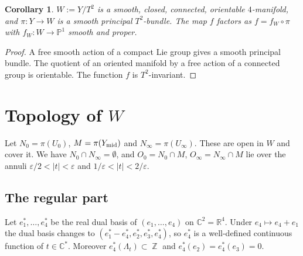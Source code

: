 \documentclass{article}
\DeclareMathOperator{\Z}{\mathbb{Z}}
\newtheorem{corollary}[theorem]{Corollary}
\theoremstyle{definition}
\theoremstyle{plain}
\newcommand{\R}{\mathbb{R}}
\newcommand{\C}{\mathbb{C}}
\newcommand{\PP}{\mathbb{P}}
\begin{document}
\begin{corollary}\label{cor:W}
$W:=Y/T^2$ is a smooth, closed, connected, orientable $4$-manifold, and $\pi\colon Y\to W$
is a smooth principal $T^2$-bundle. The map $f$ factors as $f=f_W\circ\pi$ with
$f_W\colon W\to\PP^1$ smooth and proper.
\end{corollary}
\begin{proof}
A free smooth action of a compact Lie group gives a smooth principal bundle. The
quotient of an oriented manifold by a free action of a connected group is orientable.
The function $f$ is $T^2$-invariant.
\end{proof}

\section{Topology of $W$}\label{sec:topology}

Let $N_0=\pi(U_0)$, $M=\pi(Y_{\rm mid})$ and $N_\infty=\pi(U_\infty)$. These are open in
$W$ and cover it. We have $N_0\cap N_\infty=\emptyset$, and $O_0=N_0\cap M$, $O_\infty=N_\infty\cap M$ lie over
the annuli $\varepsilon/2<|t|<\varepsilon$ and $1/\varepsilon<|t|<2/\varepsilon$.

\subsection{The regular part}
Let $e_1^*,\dots,e_4^*$ be the real dual basis of $(e_1,\dots,e_4)$ on $\C^2=\R^4$. Under
$e_4\mapsto e_4+e_1$ the dual basis changes to $(e_1^*-e_4^*,e_2^*,e_3^*,e_4^*)$, so
$e_4^*$ is a well-defined continuous function of $t\in\C^*$. Moreover
$e_4^*(\Lambda_t)\subset\Z$ and $e_4^*(e_2)=e_4^*(e_3)=0$.
\end{document}
